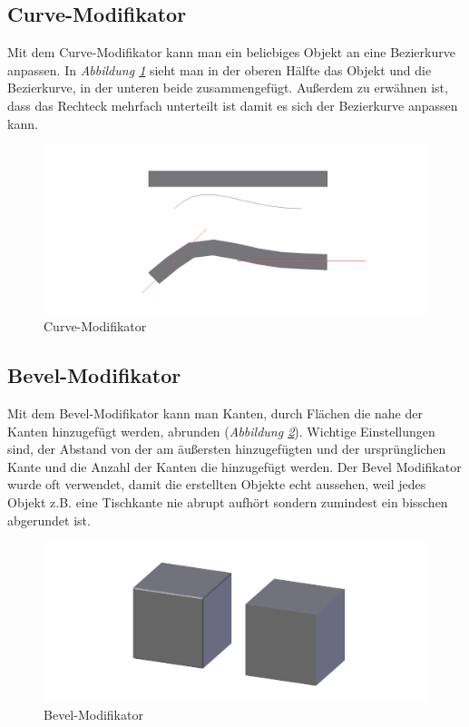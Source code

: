 \subsection{Curve-Modifikator}
\label{Curve:heading}
Mit dem Curve-Modifikator kann man ein beliebiges Objekt an eine Bezierkurve anpassen.\citep{blender:curve_modifier} In \textit{Abbildung \ref{modifikatoren:image4}} sieht man
in der oberen Hälfte das Objekt und die Bezierkurve, in der unteren beide zusammengefügt.
Außerdem zu erwähnen ist, dass das Rechteck mehrfach unterteilt ist damit es sich der Bezierkurve anpassen kann.
\begin{figure}[h]
    \centering
    \includegraphics[width=.8\textwidth]{images/Modifikatoren-Curve.png}
    \caption{Curve-Modifikator}
    \label{modifikatoren:image4}
\end{figure}

\subsection{Bevel-Modifikator}
\label{Bevel:heading}
Mit dem Bevel-Modifikator kann man Kanten, durch Flächen die nahe der Kanten hinzugefügt werden, abrunden (\textit{Abbildung \ref{modifikatoren:image5}}).\citep{blender:bevel_modifier}
Wichtige Einstellungen sind, der Abstand von der am äußersten hinzugefügten und der ursprünglichen Kante und die Anzahl der Kanten die hinzugefügt werden.
Der Bevel Modifikator wurde oft verwendet, damit die erstellten Objekte echt aussehen, weil jedes Objekt z.B. eine Tischkante nie abrupt
aufhört sondern zumindest ein bisschen abgerundet ist.
\begin{figure}[h]
    \centering
    \includegraphics[width=.8\textwidth]{images/Modifikatoren-Bevel.png}
    \caption{Bevel-Modifikator}
    \label{modifikatoren:image5}
\end{figure}

